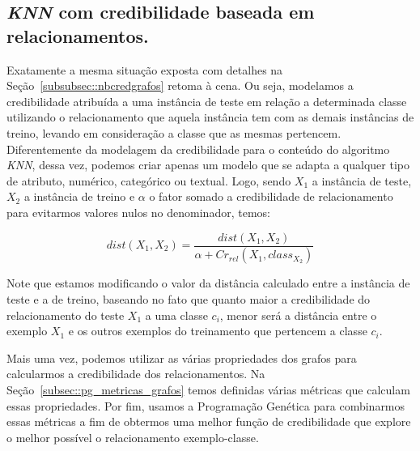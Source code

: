 \subsection{\textit{KNN} com credibilidade baseada em relacionamentos.}
\label{subsubsec::knncredgrafos}

Exatamente a mesma situação exposta com detalhes na Seção~\ref{subsubsec::nbcredgrafos} retoma à cena. Ou seja, modelamos a credibilidade atribuída a uma instância de teste em relação a determinada classe utilizando o relacionamento que aquela instância tem com as demais instâncias de treino, levando em consideração a classe que as mesmas pertencem. Diferentemente da modelagem da credibilidade para o conteúdo do algoritmo \textit{KNN}, dessa vez, podemos criar apenas um modelo que se adapta a qualquer tipo de atributo, numérico, categórico ou textual. Logo, sendo $X_1$ a instância de teste, $X_2$ a instância de treino e $\alpha$ o fator somado a credibilidade de relacionamento para evitarmos valores nulos no denominador, temos:

\begin{equation}\label{eqn::distancia_grafos}
    dist(X_1, X_2) = \frac{ dist(X_1, X_2) } { \alpha + Cr_{rel}(X_1, class_{X_2}) }
\end{equation}

Note que estamos modificando o valor da distância calculado entre a instância de teste e a de treino, baseando no fato que quanto maior a credibilidade do relacionamento do teste $X_1$ a uma classe $c_i$, menor será a distância entre o exemplo $X_1$ e os outros exemplos do treinamento que pertencem a classe $c_i$.

Mais uma vez, podemos utilizar as várias propriedades dos grafos para calcularmos a credibilidade dos relacionamentos. Na Seção~\ref{subsec::pg_metricas_grafos} temos definidas várias métricas que calculam essas propriedades. Por fim, usamos a Programação Genética para combinarmos essas métricas a fim de obtermos uma melhor função de credibilidade que explore o melhor possível o relacionamento exemplo-classe.

